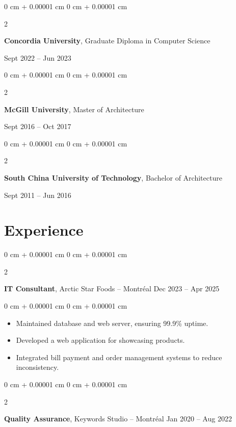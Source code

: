 \documentclass[10pt, letterpaper]{article}
\newenvironment{highlights}{
    \begin{itemize}[
        topsep=0.10 cm,
        parsep=0.10 cm,
        partopsep=0pt,
        itemsep=0pt,
        leftmargin=0 cm + 10pt
    ]
}{
    \end{itemize}
} %
\newenvironment{onecolentry}{
    \begin{adjustwidth}{
        0 cm + 0.00001 cm
    }{
        0 cm + 0.00001 cm
    }
}{
    \end{adjustwidth}
} %
\newenvironment{twocolentry}[2][]{
    \onecolentry
    \def\secondColumn{#2}
    \setcolumnwidth{\fill, 6.5 cm}
    \begin{paracol}{2}
}{
    \switchcolumn \raggedleft \secondColumn
    \end{paracol}
    \endonecolentry
} %
\begin{document}
        \begin{twocolentry}{
            Sept 2022 – Jun 2023
        }
            \textbf{Concordia University}, Graduate Diploma in Computer Science
        \end{twocolentry}

        \begin{twocolentry}{
            Sept 2016 – Oct 2017
        }
            \textbf{McGill University}, Master of Architecture
        \end{twocolentry}

        \begin{twocolentry}{
            Sept 2011 – Jun 2016
        }
            \textbf{South China University of Technology}, Bachelor of Architecture
        \end{twocolentry}


    \section{Experience}

        \begin{twocolentry}{
            Dec 2023 – Apr 2025
        }
            \textbf{IT Consultant}, Arctic Star Foods -- Montréal\end{twocolentry}

        \vspace{0.10 cm}
        \begin{onecolentry}
            \begin{highlights}
                \item Maintained database and web server, ensuring 99.9\% uptime.
                \item Developed a web application for showcasing products.
                \item Integrated bill payment and order management systems to reduce inconsistency.
            \end{highlights}
        \end{onecolentry}


        \vspace{0.2 cm}

        \begin{twocolentry}{
            Jan 2020 – Aug 2022
        }
            \textbf{Quality Assurance}, Keywords Studio -- Montréal\end{twocolentry}
\end{document}
